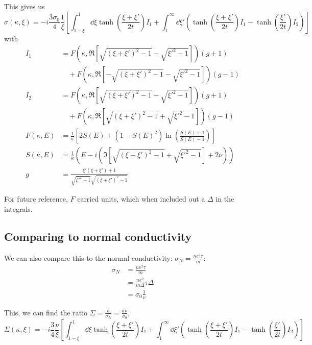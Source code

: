 \documentclass[../../main.tex]{subfiles}
\begin{document}
This gives us 
\begin{equation}
\sigma(\kappa, \xi) = -i \frac{3 \sigma_0}{4} \frac{1}{\xi}\left[\int_{1 - \xi}^{1}\dd{\xi} \tanh(\frac{\xi + \xi'}{2 t}) I_1 + \int_{1}^{\infty} \dd{\xi'} \left( \tanh(\frac{\xi + \xi'}{2t}) I_1  - \tanh(\frac{\xi'}{2t})I_2 \right) \right]
\end{equation}
with 
\begin{align}
I_1 &= F(\kappa, \Re[\sqrt{(\xi + \xi')^2 - 1} - \sqrt{\xi'^2 - 1}]) (g + 1) \nonumber\\
&\quad + F(\kappa, \Re[-\sqrt{(\xi + \xi')^2 - 1} - \sqrt{\xi'^2 - 1}]) (g - 1) \\
I_2 &= F(\kappa, \Re[\sqrt{(\xi + \xi')^2 - 1} - \sqrt{\xi'^2 - 1}]) (g + 1) \nonumber\\
&\quad + F(\kappa, \Re[\sqrt{(\xi + \xi')^2 - 1} + \sqrt{\xi'^2 - 1}]) (g - 1) \\
F(\kappa, E) &= \frac{1}{\kappa} \left[2 S(E) + (1 - S(E)^2)\ln(\frac{S(E) + 1}{S(E) - 1})\right]  \\
S(\kappa, E) &= \frac{1}{\kappa} \left(E - i \left(\Im[\sqrt{(\xi + \xi')^2 - 1} + \sqrt{\xi'^2 - 1}] + 2 \nu \right) \right) \\
g  &= \frac{\xi' \left( \xi + \xi'\right) + 1}{\sqrt{\xi'^2 - 1}\sqrt{(\xi + \xi')^2 - 1}}
\end{align}

For future reference, $F$ carried units, which when included out a $\Delta$ in the integrals.

\subsection{Comparing to normal conductivity} \label{subsec:NamForm.NormalConductivity}
We can also compare this to the normal conductivity: $\sigma_N = \frac{n e^2 \tau}{m}$:
\begin{align}
\sigma_N &= \frac{n e^2 \tau}{m} \\
&= \frac{n e^2}{m \Delta} \tau \Delta \\
&= \sigma_0 \frac{1}{\nu}
\end{align}

This, we can find the ratio $\Sigma = \frac{\sigma}{\sigma_N} = \frac{\sigma \nu}{\sigma_0}$,
\begin{equation}
\Sigma(\kappa, \xi) = -i \frac{3}{4} \frac{\nu}{\xi}\left[\int_{1 - \xi}^{1}\dd{\xi} \tanh(\frac{\xi + \xi'}{2 t}) I_1 + \int_{1}^{\infty} \dd{\xi'} \left( \tanh(\frac{\xi + \xi'}{2t}) I_1  - \tanh(\frac{\xi'}{2t})I_2 \right) \right]
\end{equation}
\end{document}
